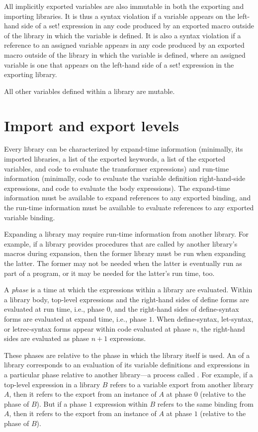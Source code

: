 All implicitly exported variables are also immutable in both the
exporting and importing libraries.
It is thus a syntax violation if a
variable appears on the left-hand side of a {\cf set!}
expression in any code produced by an exported macro outside of the
library in which the variable is defined.
It is also a syntax violation if a
reference to an assigned variable appears in any code produced by
an exported macro outside of the library in which the variable is defined,
where an assigned variable is one that appears on the left-hand
side of a {\cf set!} expression in the exporting library.

All other variables defined within a library are mutable.

\section{Import and export levels}
\label{phasessection}

Every library can be characterized by expand-time information (minimally,
its imported libraries, a list of the exported keywords, a list of the
exported variables, and code to evaluate the transformer expressions) and
run-time information (minimally, code to evaluate the variable definition
right-hand-side expressions, and code to evaluate the body expressions).
The expand-time information must be available to expand references to
any exported binding, and the run-time information must be available to
evaluate references to any exported variable binding.

Expanding a library may require run-time information from another
library. For example, if a library provides procedures that are called
by another library's macros during expansion, then the former library
must be run when expanding the latter. The former may not be needed
when the latter is eventually run as part of a program, or it may be
needed for the latter's run time, too.

%
A \emph{phase} is a time at which the expressions within a library are
evaluated.
Within a library body, top-level expressions and
the right-hand sides of {\cf define} forms are evaluated at run time,
i.e., phase $0$, and the right-hand
sides of {\cf define-syntax} forms are evaluated at expand time, i.e.,
phase $1$.
When {\cf define-syntax},
{\cf let-syntax}, or {\cf letrec-syntax}
forms appear within code evaluated at phase $n$, the right-hand sides
are evaluated as phase $n+1$ expressions.

These phases are relative to the phase in which the library itself is
used.
An  of a library corresponds to an evaluation of its
variable definitions and expressions in a particular phase relative to another
library---a process called .
For example, if a top-level expression in a library $B$ refers to
a variable export from another library $A$, then it refers to the export from an
instance of $A$ at phase $0$ (relative to the phase of $B$).
But if a phase $1$ expression within $B$ refers to the same binding from
$A$, then it refers to the export from an instance of $A$ at phase $1$
(relative to the phase of $B$).

